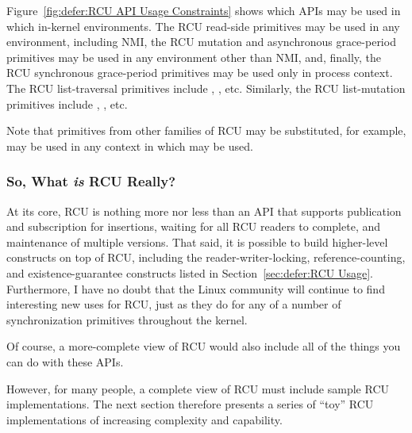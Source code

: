Figure~\ref{fig:defer:RCU API Usage Constraints}
shows which APIs may be used in which in-kernel environments.
The RCU read-side primitives may be used in any environment, including NMI,
the RCU mutation and asynchronous grace-period primitives may be used in any
environment other than NMI, and, finally, the RCU synchronous grace-period
primitives may be used only in process context.
The RCU list-traversal primitives include ,
, etc.
Similarly, the RCU list-mutation primitives include
, , etc.

Note that primitives from other families of RCU may be substituted,
for example,  may be used in any context
in which  may be used.

\subsubsection{So, What \emph{is} RCU Really?}
\label{sec:defer:So, What is RCU Really?}

At its core, RCU is nothing more nor less than an API that supports
publication and subscription for insertions, waiting for all RCU readers
to complete, and maintenance of multiple versions.
That said, it is possible to build higher-level constructs
on top of RCU, including the reader-writer-locking, reference-counting,
and existence-guarantee constructs listed in
Section~\ref{sec:defer:RCU Usage}.
Furthermore, I have no doubt that the Linux community will continue to
find interesting new uses for RCU,
just as they do for any of a number of synchronization
primitives throughout the kernel.

Of course, a more-complete view of RCU would also include
all of the things you can do with these APIs.

However, for many people, a complete view of RCU must include sample
RCU implementations.
The next section therefore presents a series of ``toy'' RCU implementations
of increasing complexity and capability.

